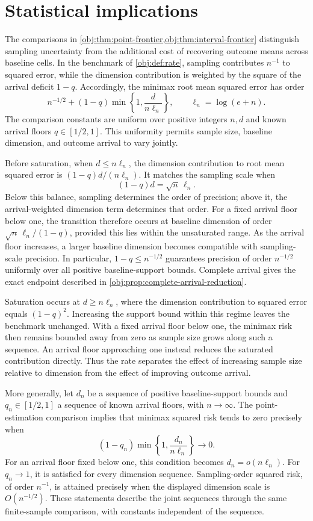\section{Statistical implications}

The comparisons in \cref{obj:thm:point-frontier,obj:thm:interval-frontier} distinguish sampling uncertainty from the additional cost of recovering outcome means across baseline cells. In the benchmark of \cref{obj:def:rate}, sampling contributes \(n^{-1}\) to squared error, while the dimension contribution is weighted by the square of the arrival deficit \(1-q\). Accordingly, the minimax root mean squared error has order
\[
n^{-1/2}+(1-q)\min\left\{1,\frac{d}{n\ell_n}\right\},
\qquad \ell_n=\log(e+n).
\]
The comparison constants are uniform over positive integers \(n,d\) and known arrival floors \(q\in[1/2,1]\). This uniformity permits sample size, baseline dimension, and outcome arrival to vary jointly.

Before saturation, when \(d\le n\ell_n\), the dimension contribution to root mean squared error is \((1-q)d/(n\ell_n)\). It matches the sampling scale when
\[
(1-q)d=\sqrt n\,\ell_n.
\]
Below this balance, sampling determines the order of precision; above it, the arrival-weighted dimension term determines that order. For a fixed arrival floor below one, the transition therefore occurs at baseline dimension of order \(\sqrt n\,\ell_n/(1-q)\), provided this lies within the unsaturated range. As the arrival floor increases, a larger baseline dimension becomes compatible with sampling-scale precision. In particular, \(1-q\le n^{-1/2}\) guarantees precision of order \(n^{-1/2}\) uniformly over all positive baseline-support bounds. Complete arrival gives the exact endpoint described in \cref{obj:prop:complete-arrival-reduction}.

Saturation occurs at \(d\ge n\ell_n\), where the dimension contribution to squared error equals \((1-q)^2\). Increasing the support bound within this regime leaves the benchmark unchanged. With a fixed arrival floor below one, the minimax risk then remains bounded away from zero as sample size grows along such a sequence. An arrival floor approaching one instead reduces the saturated contribution directly. Thus the rate separates the effect of increasing sample size relative to dimension from the effect of improving outcome arrival.

More generally, let \(d_n\) be a sequence of positive baseline-support bounds and \(q_n\in[1/2,1]\) a sequence of known arrival floors, with \(n\to\infty\). The point-estimation comparison implies that minimax squared risk tends to zero precisely when
\[
(1-q_n)\min\left\{1,\frac{d_n}{n\ell_n}\right\}\longrightarrow0.
\]
For an arrival floor fixed below one, this condition becomes \(d_n=o(n\ell_n)\). For \(q_n\to1\), it is satisfied for every dimension sequence. Sampling-order squared risk, of order \(n^{-1}\), is attained precisely when the displayed dimension scale is \(O(n^{-1/2})\). These statements describe the joint sequences through the same finite-sample comparison, with constants independent of the sequence.

